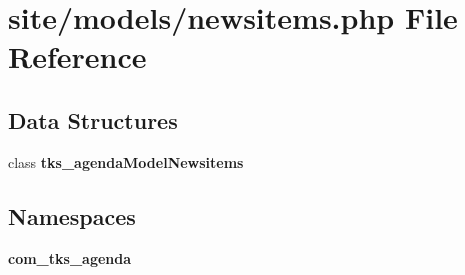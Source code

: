 \section{site/models/newsitems.php File Reference}
\label{site_2models_2newsitems_8php}
\subsection*{Data Structures}
\begin{DoxyCompactItemize}
\item 
class \textbf{ tks\+\_\+agenda\+Model\+Newsitems}
\end{DoxyCompactItemize}
\subsection*{Namespaces}
\begin{DoxyCompactItemize}
\item 
 \textbf{ com\+\_\+tks\+\_\+agenda}
\end{DoxyCompactItemize}
